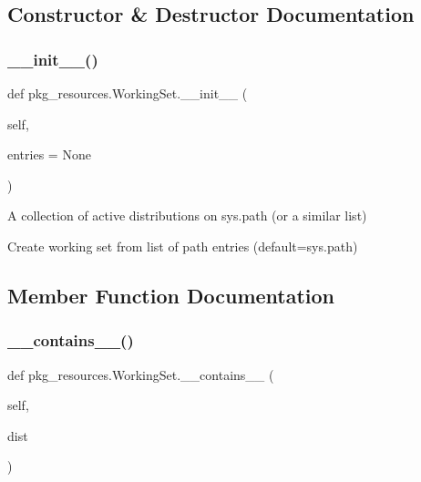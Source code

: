 \subsection{Constructor \& Destructor Documentation}
\mbox{\label{classpkg__resources_1_1_working_set_a88df1aa3c1781fcb4576a56854bab8da}} 
\subsubsection{\texorpdfstring{\+\_\+\+\_\+init\+\_\+\+\_\+()}{\_\_init\_\_()}}
{\footnotesize\ttfamily def pkg\+\_\+resources.\+Working\+Set.\+\_\+\+\_\+init\+\_\+\+\_\+ (\begin{DoxyParamCaption}\item[{}]{self,  }\item[{}]{entries = {\ttfamily None} }\end{DoxyParamCaption})}

\begin{DoxyVerb}A collection of active distributions on sys.path (or a similar list)\end{DoxyVerb}
\begin{DoxyVerb}Create working set from list of path entries (default=sys.path)\end{DoxyVerb}
 

\subsection{Member Function Documentation}
\mbox{\label{classpkg__resources_1_1_working_set_a6a4880a5d32dac95a7b93f03f7ebc5b9}} 
\subsubsection{\texorpdfstring{\+\_\+\+\_\+contains\+\_\+\+\_\+()}{\_\_contains\_\_()}}
{\footnotesize\ttfamily def pkg\+\_\+resources.\+Working\+Set.\+\_\+\+\_\+contains\+\_\+\+\_\+ (\begin{DoxyParamCaption}\item[{}]{self,  }\item[{}]{dist }\end{DoxyParamCaption})}

